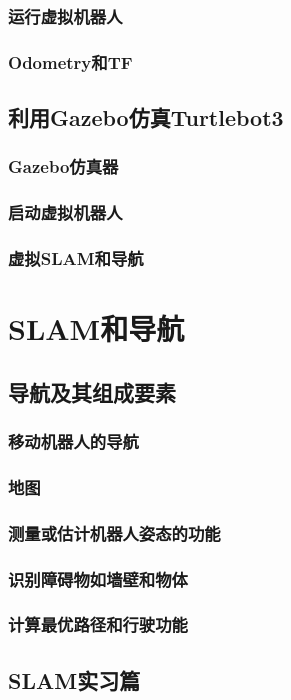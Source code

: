 \documentclass[geye,green,kindle,cn]{elegantnote}
\begin{document}
\subsubsection{运行虚拟机器人}
\subsubsection{Odometry和TF}
\subsection{利用Gazebo仿真Turtlebot3}
\subsubsection{Gazebo仿真器}
\subsubsection{启动虚拟机器人}
\subsubsection{虚拟SLAM和导航}
\section{SLAM和导航}
\subsection{导航及其组成要素}
\subsubsection{移动机器人的导航}
\subsubsection{地图}
\subsubsection{测量或估计机器人姿态的功能}
\subsubsection{识别障碍物如墙壁和物体}
\subsubsection{计算最优路径和行驶功能}
\subsection{SLAM实习篇}
\end{document}
